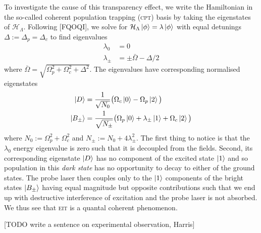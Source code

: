     To investigate the cause of this transparency effect, we write the
    Hamiltonian in the so-called coherent population trapping (\textsc{cpt})
    basis by taking the eigenstates of $\mathcal{H}_\Lambda$. Following [FQOQI],
    we solve for $\mathcal{H}_\Lambda \Ket{\phi} = \lambda \Ket{\phi}$ with
    equal detunings $\Delta := \Delta_p = \Delta_c$ to find eigenvalues
    \begin{subequations}
      \begin{align}
      \lambda_0 &= 0 \\
      \lambda_\pm &= \pm \bar{\Omega} -\Delta/2 
      \end{align}
      \label{eqn:lambda_eigvals}
    \end{subequations}
    where $\bar{\Omega}= \sqrt{\Omega_p^2 + \Omega_c^2 + \Delta^2}$. The
    eigenvalues have corresponding normalised eigenstates 
    \begin{subequations}
      \begin{align}
        \Ket{D} &= \frac{1}{\sqrt{N_0}} \big( \Omega_c \Ket{0} - \Omega_p 
        \Ket{2} \big) \\
        \Ket{B_\pm} &= \frac{1}{\sqrt{N_\pm}} \big( \Omega_p \Ket{0} + 
          \lambda_\pm \Ket{1} + \Omega_c \Ket{2} \big)
      \end{align}
      \label{eqn:lambda_eigvects}
    \end{subequations}
    where $N_0 := \Omega_p^2 + \Omega_c^2$ and $N_\pm := N_0 + 4 \lambda_\pm^2$.
    The first thing to notice is that the $\lambda_0$ energy eigenvalue is zero
    such that it is decoupled from the fields. Second, its corresponding
    eigenstate $\Ket{D}$ has no component of the excited state $\Ket{1}$ and so
    population in this \textit{dark state} has no opportunity to decay to either
    of the ground states. The probe laser then couples only to the $\Ket{1}$
    components of the bright states $\Ket{B_\pm}$ having equal magnitude but
    opposite contributions such that we end up with destructive interference of
    excitation and the probe laser is not absorbed. We thus see that
    \textsc{eit} is a quantal coherent phenomenon.

    [TODO write a sentence on experimental observation, Harris]

    \cite{Harris1990, Boller1991}